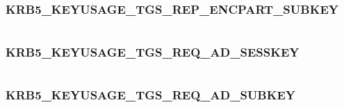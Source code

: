 \documentclass[letterpaper,10pt,english]{sphinxmanual}
\begin{document}
\subsubsection{KRB5\_KEYUSAGE\_TGS\_REP\_ENCPART\_SUBKEY}
\label{appdev/refs/macros/KRB5_KEYUSAGE_TGS_REP_ENCPART_SUBKEY:krb5-keyusage-tgs-rep-encpart-subkey-data}\label{appdev/refs/macros/KRB5_KEYUSAGE_TGS_REP_ENCPART_SUBKEY::doc}\label{appdev/refs/macros/KRB5_KEYUSAGE_TGS_REP_ENCPART_SUBKEY:krb5-keyusage-tgs-rep-encpart-subkey}

\begin{fulllineitems}
\label{appdev/refs/macros/KRB5_KEYUSAGE_TGS_REP_ENCPART_SUBKEY:KRB5_KEYUSAGE_TGS_REP_ENCPART_SUBKEY}
\end{fulllineitems}


\begin{tabulary}{\linewidth}{|L|L|}
\hline

 & 
\\\hline
\end{tabulary}



\subsubsection{KRB5\_KEYUSAGE\_TGS\_REQ\_AD\_SESSKEY}
\label{appdev/refs/macros/KRB5_KEYUSAGE_TGS_REQ_AD_SESSKEY::doc}\label{appdev/refs/macros/KRB5_KEYUSAGE_TGS_REQ_AD_SESSKEY:krb5-keyusage-tgs-req-ad-sesskey}\label{appdev/refs/macros/KRB5_KEYUSAGE_TGS_REQ_AD_SESSKEY:krb5-keyusage-tgs-req-ad-sesskey-data}

\begin{fulllineitems}
\label{appdev/refs/macros/KRB5_KEYUSAGE_TGS_REQ_AD_SESSKEY:KRB5_KEYUSAGE_TGS_REQ_AD_SESSKEY}
\end{fulllineitems}


\begin{tabulary}{\linewidth}{|L|L|}
\hline

 & 
\\\hline
\end{tabulary}



\subsubsection{KRB5\_KEYUSAGE\_TGS\_REQ\_AD\_SUBKEY}
\label{appdev/refs/macros/KRB5_KEYUSAGE_TGS_REQ_AD_SUBKEY:krb5-keyusage-tgs-req-ad-subkey}\label{appdev/refs/macros/KRB5_KEYUSAGE_TGS_REQ_AD_SUBKEY::doc}\label{appdev/refs/macros/KRB5_KEYUSAGE_TGS_REQ_AD_SUBKEY:krb5-keyusage-tgs-req-ad-subkey-data}
\end{document}
